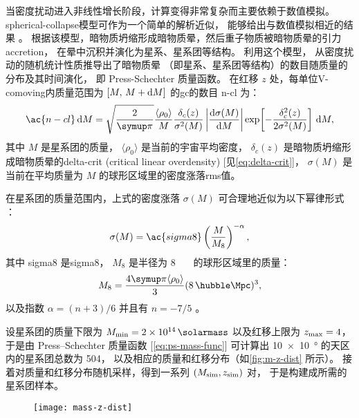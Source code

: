 当密度扰动进入非线性增长阶段，计算变得非常复杂而主要依赖于数值模拟。
\ac{spherical-collapse}模型可作为一个简单的解析近似，
能够给出与数值模拟相近的结果 \cite{gunn1972}。
根据该模型，暗物质坍缩形成暗物质晕，然后重子物质被暗物质晕的引力\ac{accretion}，
在晕中沉积并演化为星系、星系团等结构。
利用这个模型， 从密度扰动的随机统计性质推导出了暗物质晕
（即星系、星系团等结构）的数目随质量的分布及其时间演化，
即 Press-Schechter 质量函数。
在红移 $z$ 处，每单位\ac{V-comoving}内质量范围为 $[M,\, M+\mathrm{d}M]$
的\ac{gc}的数目 \ac{n-cl} 为：
\begin{equation}
  \label{eq:ps-mass-func}
  \ac{n-cl} \,\D{M} =
    \sqrt{\frac{2}{\Cpi}} \frac{\langle \rho_0 \rangle}{M}
    \frac{\delta_c(z)}{\sigma^2(M)} \left| \diff{\sigma(M)}{M} \right|
    \exp\!\left[ -\frac{\delta_c^2(z)}{2\sigma^2(M)} \right] \,\D{M} ,
\end{equation}
其中
$M$ 是星系团的质量，
$\langle \rho_0 \rangle$ 是当前的宇宙平均密度，
$\delta_c(z)$ 是暗物质坍缩形成暗物质晕的\acl{delta-crit}
(critical linear overdensity) [见\autoref{eq:delta-crit}]，
$\sigma(M)$ 是当前在平均质量为 $M$ 的球形区域里的密度涨落\ac{rms}值。

在星系团的质量范围内，上式的密度涨落 $\sigma(M)$ 可合理地近似为以下幂律形式
\cite{sarazin2002,randall2002}：
\begin{equation}
  \label{eq:sigma-mass}
  \sigma(M) = \ac{sigma8} \left( \frac{M}{M_8} \right)^{-\alpha} ,
\end{equation}
其中
\ac{sigma8} 是\acl{sigma8}，
$M_8$ 是半径为 \SI{8}{\per\hubble\Mpc} 的球形区域里的质量：
\begin{equation}
  M_8 = \frac{4\Cpi \langle \rho_0 \rangle}{3}
    (\SI{8}{\per\hubble\Mpc})^3 ,
\end{equation}
以及指数 $\alpha = (n+3)/6$ 并且有 $n = -7/5$ \cite{bahcall1998}。

设星系团的质量下限为 $M_{\R{min}} = \SI{2e14}{\solarmass}$
以及红移上限为 $z_{\mathrm{max}} = 4$，
于是由 Press--Schechter 质量函数 [\autoref{eq:ps-mass-func}]
可计算出 \SI{10 x 10}{\degree} 的天区内的星系团总数为 504，
以及相应的质量和红移分布（如\autoref{fig:m-z-dist} 所示）。
接着对质量和红移分布随机采样，得到一系列 $(M_{\mathrm{sim}}, z_{\mathrm{sim}})$ 对，
于是构建成所需的星系团样本。

\begin{figure}[htp]
  \centering
  \texttt{[image: mass-z-dist]}
  \label{fig:m-z-dist}
\end{figure}

